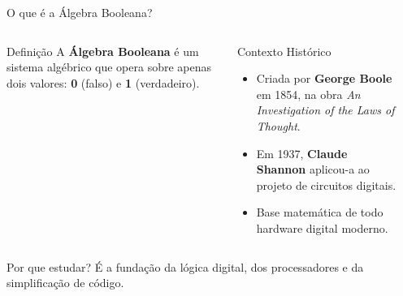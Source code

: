 \documentclass[9pt]{beamer}
\begin{document}
\begin{frame}{O que é a Álgebra Booleana?}

\begin{columns}


\begin{block}{Definição}
A \textbf{Álgebra Booleana} é um sistema algébrico que opera sobre apenas \alert{dois valores}: \textbf{0} (falso) e \textbf{1} (verdadeiro).
\end{block}

\vspace{0.3cm}

\begin{block}{Contexto Histórico}
\begin{itemize}
    \item Criada por \textbf{George Boole} em 1854, na obra \textit{An Investigation of the Laws of Thought}.
    \item Em 1937, \textbf{Claude Shannon} aplicou-a ao projeto de circuitos digitais.
    \item Base matemática de todo hardware digital moderno.
\end{itemize}
\end{block}


\begin{center}
\end{center}

\end{columns}

\vspace{0.2cm}

\begin{alertblock}{Por que estudar?}
É a fundação da lógica digital, dos processadores e da simplificação de código.
\end{alertblock}

\end{frame}
\end{document}
